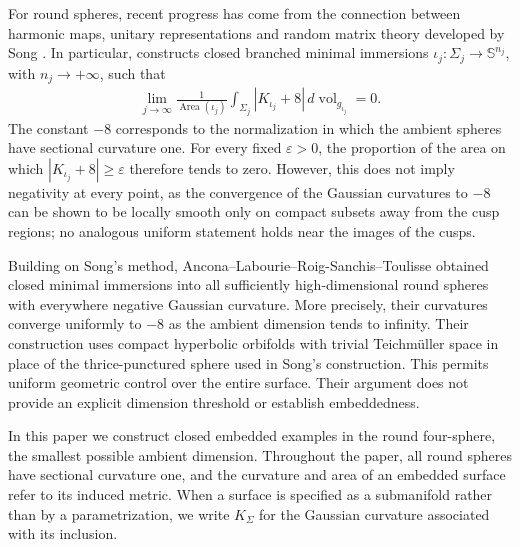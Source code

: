 \documentclass[a4paper,11pt,oneside,reqno]{amsart}
\numberwithin{equation}{section}
\theoremstyle{definition}
\begin{document}
For round spheres, recent progress has come from the connection
between harmonic maps, unitary representations and random
matrix theory developed by Song
\cite{SongRandomHarmonicMaps}.
In particular, \cite[Theorem~0.3]{SongRandomHarmonicMaps}
constructs closed branched minimal immersions
$\iota_j:\Sigma_j\to\mathbb{S}^{n_j}$, with
$n_j\to+\infty$, such that
%
\begin{align*}
    \lim_{j\to\infty}
    \frac{1}{\operatorname{Area}(\iota_j)}
    \int_{\Sigma_j}
    |K_{\iota_j}+8|\,
    d\operatorname{vol}_{g_{\iota_j}}=0.
\end{align*}
%
The constant $-8$ corresponds to the normalization in which
the ambient spheres have sectional curvature one.
For every fixed $\varepsilon>0$, the proportion of the area
on which $|K_{\iota_j}+8|\geq\varepsilon$ therefore tends
to zero. However, this does not imply negativity at every point, as the convergence of the Gaussian curvatures to $-8$ can be shown to be locally smooth only on compact subsets away from the cusp regions; no analogous uniform statement holds near the images of the cusps. 

Building on Song's method,
Ancona--Labourie--Roig-Sanchis--Toulisse
\cite{AnconaLabourieRoigSanchisToulisse}
obtained closed minimal immersions into all sufficiently
high-dimensional round spheres with everywhere negative
Gaussian curvature. More precisely, their curvatures
converge uniformly to $-8$ as the ambient dimension tends
to infinity. Their construction uses compact
hyperbolic orbifolds with trivial Teichm\"uller space in place of
the thrice-punctured sphere used in Song's construction.
This permits uniform geometric control over the entire
surface. Their argument does not provide an explicit
dimension threshold or establish embeddedness.

In this paper we construct closed embedded examples in
the round four-sphere, the smallest possible ambient
dimension.
Throughout the paper, all round spheres have sectional
curvature one, and the curvature and area of an embedded
surface refer to its induced metric. When a surface is
specified as a submanifold rather than by a parametrization,
we write $K_\Sigma$ for the Gaussian curvature associated
with its inclusion.
\end{document}
